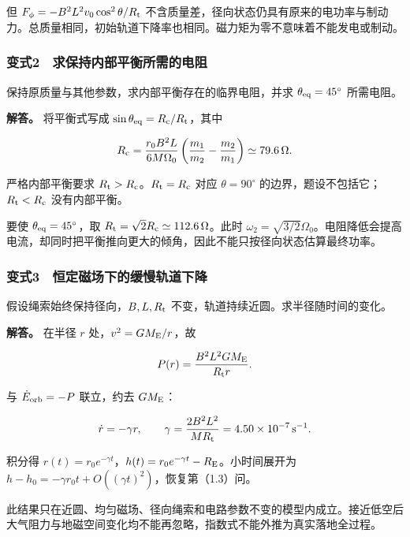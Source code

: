 \documentclass[12pt,a4paper,fontset=fandol]{ctexart}
\begin{document}
但 \(F_\phi=-B^2L^2v_0\cos^2\theta/R_{\rm t}\)
不含质量差，径向状态仍具有原来的电功率与制动力。总质量相同，初始轨道下降率也相同。磁力矩为零不意味着不能发电或制动。

\subsubsection{变式2　求保持内部平衡所需的电阻}\label{ux53d8ux5f0f2-ux6c42ux4fddux6301ux5185ux90e8ux5e73ux8861ux6240ux9700ux7684ux7535ux963b}

保持原质量与其他参数，求内部平衡存在的临界电阻，并求
\(\theta_{\rm eq}=45^\circ\) 所需电阻。

\textbf{解答。} 将平衡式写成
\(\sin\theta_{\rm eq}=R_{\rm c}/R_{\rm t}\)，其中

\[
R_{\rm c}=\frac{r_0B^2L}{6M\Omega_0}
\left(\frac{m_1}{m_2}-\frac{m_2}{m_1}\right)\simeq79.6\,\Omega.
\]

严格内部平衡要求 \(R_{\rm t}>R_{\rm c}\)。\(R_{\rm t}=R_{\rm c}\) 对应
\(\theta=90^\circ\) 的边界，题设不包括它；\(R_{\rm t}<R_{\rm c}\)
没有内部平衡。

要使 \(\theta_{\rm eq}=45^\circ\)，取
\(R_{\rm t}=\sqrt2R_{\rm c}\simeq112.6\,\Omega\)。此时
\(\omega_2=\sqrt{3/2}\Omega_0\)。电阻降低会提高电流，却同时把平衡推向更大的倾角，因此不能只按径向状态估算最终功率。

\subsubsection{变式3　恒定磁场下的缓慢轨道下降}\label{ux53d8ux5f0f3-ux6052ux5b9aux78c1ux573aux4e0bux7684ux7f13ux6162ux8f68ux9053ux4e0bux964d}

假设绳索始终保持径向，\(B,L,R_{\rm t}\)
不变，轨道持续近圆。求半径随时间的变化。

\textbf{解答。} 在半径 \(r\) 处，\(v^2=GM_{\rm E}/r\)，故

\[
P(r)=\frac{B^2L^2GM_{\rm E}}{R_{\rm t}r}.
\]

与 \(\dot E_{\rm orb}=-P\) 联立，约去 \(GM_{\rm E}\)：

\[
\dot r=-\gamma r,\qquad
\gamma=\frac{2B^2L^2}{MR_{\rm t}}=4.50\times10^{-7}\,\mathrm{s^{-1}}.
\]

积分得
\(r(t)=r_0e^{-\gamma t}\)，\(h(t)=r_0e^{-\gamma t}-R_{\rm E}\)。小时间展开为
\(h-h_0=-\gamma r_0t+O((\gamma t)^2)\)，恢复第（1.3）问。

此结果只在近圆、均匀磁场、径向绳索和电路参数不变的模型内成立。接近低空后大气阻力与地磁空间变化均不能再忽略，指数式不能外推为真实落地全过程。
\end{document}
